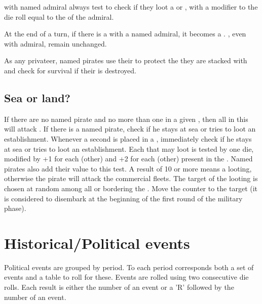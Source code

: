 \aparag \PIRATE with named admiral always test to check if they loot a
\TP or \COL, with a modifier to the die roll equal to the 
of the admiral.

\aparag At the end of a turn, if there is a \PIRATE\facemoins with a
named admiral, it becomes a \PIRATE\faceplus. \PIRATE\faceplus, even
with admiral, remain unchanged.

\aparag As any privateer, named pirates use their  to
protect the \PIRATE they are stacked with and check for survival if
their \PIRATE is destroyed.



\subsection{Sea or land?}\label{chEvents:PiracyTarget}

\aparag If there are no named pirate and no more than one
\PIRATE\faceplus in a given \STZ, then all \PIRATE in this \STZ will
attack \TradeFLEET.
\bparag If there is a named pirate, check if he stays at sea or tries to
loot an establishment.
\bparag Whenever a second \PIRATE\faceplus is placed in a \STZ,
immediately check if he stays at sea or tries to loot an establishment.
\aparag Each \PIRATE that may loot is tested by one die, modified by +1
for each (other) \PIRATE\facemoins and +2 for each (other)
\PIRATE\faceplus present in the \STZ.
\bparag Named pirates also add their  value to this test.
\bparag A result of 10 or more means a looting, otherwise the pirate
will attack the commercial fleets.
\bparag The target of the looting is chosen at random among all \TP or
\COL bordering the \STZ. Move the counter to the target (it is
considered to disembark at the beginning of the first round of the
military phase).




\section{Historical/Political events}\label{chEvents:political-events}

\aparag Political events are grouped by period. To each period
corresponds both a set of events and a table to roll for these. Events
are rolled using two consecutive die rolls. Each result is either the
number of an event or a 'R' followed by the number of an event.


